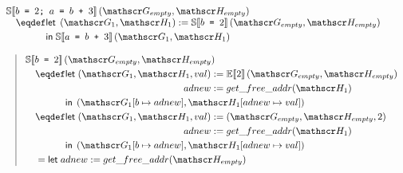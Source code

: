 \begin{figure}
\[
  \begin{array}{l}
    \Ctx{S}{b \texttt{ = } 2\texttt{; } a \texttt{ = } b \texttt{ + } 3}\left(\Glo_{empty}, \Hea_{empty}\right) \\
    \quad \eqdef
      \begin{aligned}[t]
        &\letm \left(\Glo_1, \Hea_1\right) := \Ctx{S}{b \texttt{ = } 2}\left(\Glo_{empty}, \Hea_{empty}\right) \\
        &\inm \Ctx{S}{a \texttt{ = } b \texttt{ + } 3}\left(\Glo_1, \Hea_1\right) \\
      \end{aligned}\\
    \\
    \quad\vrule\quad
      \begin{aligned}[t]
        &\Ctx{S}{b \texttt{ = } 2}\left(\Glo_{empty}, \Hea_{empty}\right) \\
        &\quad\eqdef
        \begin{aligned}[t]
          &\letm
          \begin{aligned}[t]
            \left(\Glo_1, \Hea_1, val\right) &:= \Ctx{E}{2}\left(\Glo_{empty}, \Hea_{empty}\right) \\
            adnew &:= get\_free\_addr(\Hea_1) \\
          \end{aligned}\\
          &\inm \left(\Glo_1[b \mapsto adnew], \Hea_1[adnew \mapsto val]\right) \\
        \end{aligned}\\
        &\quad\eqdef
        \begin{aligned}[t]
          &\letm
          \begin{aligned}[t]
            \left(\Glo_1, \Hea_1, val\right) &:= \left(\Glo_{empty}, \Hea_{empty}, 2\right) \\
            adnew &:= get\_free\_addr(\Hea_1) \\
          \end{aligned}\\
          &\inm \left(\Glo_1[b \mapsto adnew], \Hea_1[adnew \mapsto val]\right) \\
        \end{aligned}\\
        &\quad=
        \begin{aligned}[t]
          &\letm adnew := get\_free\_addr(\Hea_{empty}) \\

\end{aligned}
\end{aligned}
\end{array}\]
\end{figure}
